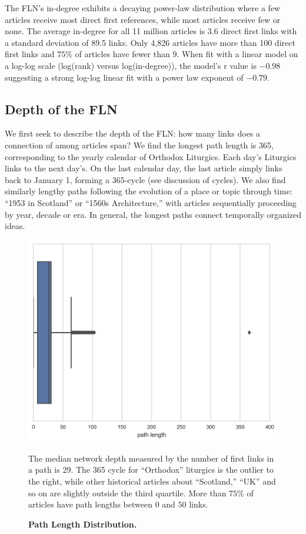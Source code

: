\documentclass[pre,twocolumn,twoside,superscriptaddress,floatfix, aps, 10pt]{revtex4-1}
\begin{document}
The FLN's in-degree exhibits a decaying power-law distribution where a few articles 
receive most direct first references, while most articles receive few or none.
The average in-degree for all 11 million articles is 3.6 direct first links with a standard deviation of 89.5 links.
Only 4,826 articles have more than 100 direct first links and $75\%$ of articles
have fewer than 9. 
When fit with a linear model on a log-log scale (log(rank) versus log(in-degree)), 
the model's r value is $-0.98$ suggesting a strong log-log linear fit 
with a power law exponent of $-0.79$.\\



\subsection{Depth of the FLN}

We first seek to describe the depth of the FLN: how many links does a 
connection of among articles span? 
We find the longest path length is 365,
corresponding to the yearly calendar of Orthodox Liturgics.
Each day's Liturgics links to the next day's. On the last calendar day, the last article simply links back to January 1, forming a 365-cycle 
(see discussion of cycles).
We also find similarly lengthy paths following the evolution of a place or topic through time: 
``1953 in Scotland'' or ``1560s Architecture,'' with articles sequentially proceeding by year, decade or era.
In general, the longest paths connect temporally organized ideas.

\begin{figure}[tp!]
  \centering	
  \includegraphics[width=\columnwidth]{graphics/path_lengths_boxplot.png}
  \caption{
    \textbf{Path Length Distribution.}
  }
  The median network depth measured by the number of first links in a path
  is 29. The 365 cycle for ``Orthodox'' liturgics is the outlier to the right, while
  other historical articles about ``Scotland,'' ``UK'' and so on are slightly outside
  the third quartile. More than $75\%$ of articles have path lengths between 
  $0$ and $50$ links.

  \label{fig:Path Length Distribution}
\end{figure}
\end{document}
